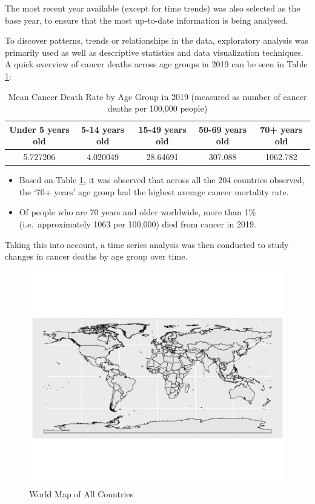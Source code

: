 \documentclass[11pt,a4paper,]{article}
\providecommand{\tightlist}{%
  \setlength{\itemsep}{0pt}\setlength{\parskip}{0pt}}
\begin{document}
The most recent year available (except for time trends) was also selected as the base year, to ensure that the most up-to-date information is being analysed.

To discover patterns, trends or relationships in the data, exploratory analysis was primarily used as well as descriptive statistics and data visualization techniques. A quick overview of cancer deaths across age groups in 2019 can be seen in Table \ref{tab:tableref}:

\begin{table}

\caption{\label{tab:tableref}Mean Cancer Death Rate by Age Group in 2019 (measured as number of cancer deaths per 100,000 people)}
\centering
\begin{tabular}[t]{c|c|c|c|c}
\hline
Under 5 years old & 5-14 years old & 15-49 years old & 50-69 years old & 70+ years old\\
\hline
5.727206 & 4.020049 & 28.64691 & 307.088 & 1062.782\\
\hline
\end{tabular}
\end{table}

\begin{itemize}
\tightlist
\item
  Based on Table \ref{tab:tableref}, it was observed that across all the 204 countries observed, the `70+ years' age group had the highest average cancer mortality rate.
\item
  Of people who are 70 years and older worldwide, more than 1\% (i.e.~approximately 1063 per 100,000) died from cancer in 2019.
\end{itemize}

Taking this into account, a time series analysis was then conducted to study changes in cancer deaths by age group over time.

\begin{figure}
\centering
\includegraphics{etc5513_assignment2_g1_t1_files/figure-latex/worldmap-1.pdf}
\caption{\label{fig:worldmap}World Map of All Countries}
\end{figure}
\end{document}
